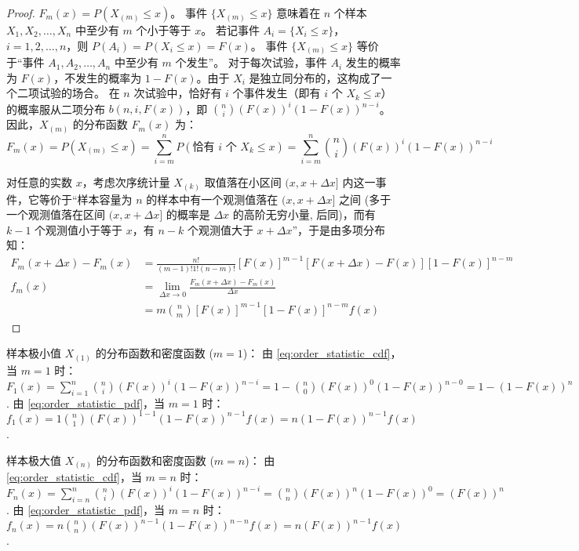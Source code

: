 \begin{proof}
$F_m(x) = P(X_{(m)} \le x)$。
事件 $\{X_{(m)} \le x\}$ 意味着在 $n$ 个样本 $X_1, X_2, \ldots, X_n$ 中至少有 $m$ 个小于等于 $x$。
若记事件 $A_i = \{X_i \le x\}$，$i=1,2,\ldots,n$，则 $P(A_i) = P(X_i \le x) = F(x)$。
事件 $\{X_{(m)} \le x\}$ 等价于“事件 $A_1, A_2, \ldots, A_n$ 中至少有 $m$ 个发生”。
对于每次试验，事件 $A_i$ 发生的概率为 $F(x)$，不发生的概率为 $1-F(x)$。由于 $X_i$ 是独立同分布的，这构成了一个二项试验的场合。
在 $n$ 次试验中，恰好有 $i$ 个事件发生（即有 $i$ 个 $X_k \le x$）的概率服从二项分布 $b(n, i, F(x))$，即 $\binom{n}{i} (F(x))^i (1-F(x))^{n-i}$。
因此，$X_{(m)}$ 的分布函数 $F_m(x)$ 为：
\[
F_m(x) = P(X_{(m)} \le x) = \sum_{i=m}^n P(\text{恰有 } i \text{ 个 } X_k \le x) = \sum_{i=m}^n \binom{n}{i} (F(x))^i (1-F(x))^{n-i}
\]

对任意的实数 $x$，考虑次序统计量 $X_{(k)}$ 取值落在小区间 $(x,x+\Delta x]$ 内这一事件，它等价于“样本容量为 $n$ 的样本中有一个观测值落在 $(x,x+\Delta x]$ 之间 (多于一个观测值落在区间 $(x,x+\Delta x]$ 的概率是 $\Delta x$ 的高阶无穷小量, 后同)，而有 $k-1$ 个观测值小于等于 $x$，有 $n-k$ 个观测值大于 $x+\Delta x$”，于是由多项分布知：
\begin{align*}
F_m(x+\Delta x) - F_m(x) &= \frac{n!}{(m-1)!1!(n-m)!} [F(x)]^{m-1} [F(x+\Delta x)-F(x)] [1-F(x)]^{n-m} \\
f_m(x) &= \lim_{\Delta x \to 0} \frac{F_m(x+\Delta x) - F_m(x)}{\Delta x} \\
&= m \binom{n}{m} [F(x)]^{m-1} [1-F(x)]^{n-m} f(x)
\end{align*}
\end{proof}
\begin{remark}
    样本极小值 $X_{(1)}$ 的分布函数和密度函数 ($m=1$)：
    由 \eqref{eq:order_statistic_cdf}，当 $m=1$ 时：
    $F_1(x) = \sum_{i=1}^n \binom{n}{i} (F(x))^i (1-F(x))^{n-i} = 1 - \binom{n}{0} (F(x))^0 (1-F(x))^{n-0} = 1 - (1-F(x))^n$.
    由 \eqref{eq:order_statistic_pdf}，当 $m=1$ 时：
    $f_1(x) = 1 \binom{n}{1} (F(x))^{1-1}(1-F(x))^{n-1} f(x) = n(1-F(x))^{n-1}f(x)$.

    样本极大值 $X_{(n)}$ 的分布函数和密度函数 ($m=n$)：
    由 \eqref{eq:order_statistic_cdf}，当 $m=n$ 时：
    $F_n(x) = \sum_{i=n}^n \binom{n}{i} (F(x))^i (1-F(x))^{n-i} = \binom{n}{n} (F(x))^n (1-F(x))^0 = (F(x))^n$.
    由 \eqref{eq:order_statistic_pdf}，当 $m=n$ 时：
    $f_n(x) = n \binom{n}{n} (F(x))^{n-1}(1-F(x))^{n-n} f(x) = n(F(x))^{n-1}f(x)$.
\end{remark}

